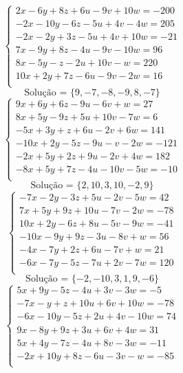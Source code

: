 \documentclass[12pt,oneside,a4paper]{article}
\begin{document}
\vspace{\baselineskip}
\begin{equation*}
\begin{cases}
2x-6y+8z+6u-9v+10w=-200 \\
-2x-10y-6z-5u+4v-4w=205 \\
-2x-2y+3z-5u+4v+10w=-21 \\
7x-9y+8z-4u-9v-10w=96 \\
8x-5y-z-2u+10v-w=220 \\
10x+2y+7z-6u-9v-2w=16 \\
\end{cases}
\end{equation*}
\begin{equation*}
\text{Solução = }\{9,-7,-8,-9,8,-7\}
\end{equation*}
\vspace{\baselineskip}
\begin{equation*}
\begin{cases}
9x+6y+6z-9u-6v+w=27 \\
8x+5y-9z+5u+10v-7w=6 \\
-5x+3y+z+6u-2v+6w=141 \\
-10x+2y-5z-9u-v-2w=-121 \\
-2x+5y+2z+9u-2v+4w=182 \\
-8x+5y+7z-4u-10v-5w=-10 \\
\end{cases}
\end{equation*}
\begin{equation*}
\text{Solução = }\{2,10,3,10,-2,9\}
\end{equation*}
\vspace{\baselineskip}
\begin{equation*}
\begin{cases}
-7x-2y-3z+5u-2v-5w=42 \\
7x+5y+9z+10u-7v-2w=-78 \\
10x+2y-6z+8u-5v-9w=-41 \\
-10x-9y+9z-3u-8v+w=56 \\
-4x-7y+2z+6u-7v+w=21 \\
-6x-7y-5z-7u+2v-7w=120 \\
\end{cases}
\end{equation*}
\begin{equation*}
\text{Solução = }\{-2,-10,3,1,9,-6\}
\end{equation*}
\vspace{\baselineskip}
\begin{equation*}
\begin{cases}
5x+9y-5z-4u+3v-3w=-5 \\
-7x-y+z+10u+6v+10w=-78 \\
-6x-10y-5z+2u+4v-10w=74 \\
9x-8y+9z+3u+6v+4w=31 \\
5x+4y-7z-4u+8v-3w=-11 \\
-2x+10y+8z-6u-3v-w=-85 \\
\end{cases}
\end{equation*}
\end{document}
